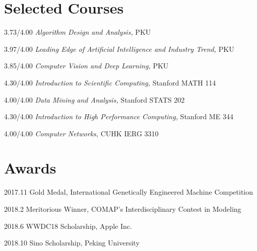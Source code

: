 \documentclass{academiccv}
\begin{document}
\newpage

\section*{Selected Courses}

\begin{tablist}

\item[3.73/4.00] \tab \emph{Algorithm Design and Analysis}\emph, PKU
\item[3.97/4.00] \tab  \emph{Leading Edge of Artificial Intelligence and Industry Trend}\emph, PKU
\item[3.85/4.00] \tab \emph{Computer Vision and Deep Learning}\emph, PKU
\item[4.30/4.00] \tab \emph{Introduction to Scientific Computing}\emph, Stanford MATH 114

\item[4.00/4.00] \tab \emph{Data Mining and Analysis}\emph, Stanford STATS 202

\item[4.30/4.00] \tab \emph{Introduction to High Performance Computing}\emph, Stanford ME 344

\item[4.00/4.00] \tab \emph{Computer Networks}\emph, CUHK IERG 3310

\end{tablist}


\section*{Awards}

\begin{tablist}
	\item[2017.11] \tab Gold Medal, International Genetically Engineered Machine Competition

	\item[2018.2] \tab Meritorious Winner, COMAP's Interdisciplinary Contest in Modeling

	\item[2018.6] \tab WWDC18 Scholarship, Apple Inc.
	
	\item[2018.10] \tab Sino Scholarship, Peking University

	\end{tablist}
\end{document}
